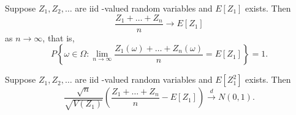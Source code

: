 \begin{theorem} \label{thm:dtmc:slln}
    Suppose $Z_1, Z_2, \dots$ are iid \R-valued random variables and $E[Z_1]$
    exists.
    Then \[
        \frac{Z_1 + \dots + Z_n}{n} \to E[Z_1]
    \] as $n \to \infty$, that is, \[
        P\left\{\omega \in \Omega : \lim_{n \to \infty}
        \frac{Z_1(\omega) + \dots + Z_n(\omega)}{n} = E[Z_1]\right\} = 1.
    \]
\end{theorem}
\begin{theorem} \label{thm:dtmc:wlln}
    
\end{theorem}
\begin{theorem} \label{thm:dtmc:clt}
    Suppose $Z_1, Z_2, \dots$ are iid \R-valued random variables and $E[Z_1^2]$
    exists.
    Then \[
        \frac{\sqrt n}{\sqrt{V(Z_1)}} \left(\frac{Z_1 + \dots + Z_n}{n}
        - E[Z_1]\right) \stackrel{d}{\to} N(0, 1).
    \]
\end{theorem}
